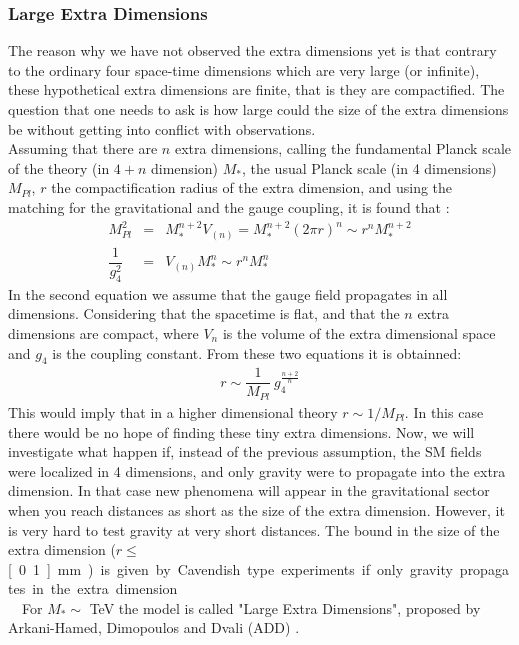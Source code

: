	

\subsubsection{Large Extra Dimensions}

The reason why we have not observed the extra dimensions yet is that contrary to the ordinary four space-time dimensions which are very large (or infinite), these hypothetical extra dimensions are finite, that is they are compactified. The  question that one needs to ask is how large could the size of the extra dimensions be without getting into conflict with observations.\\
\indent 
Assuming that there are $n$ extra dimensions, calling the fundamental Planck scale of the theory (in $4+n$ dimension) $M_{*}$, the usual Planck scale (in 4 dimensions) $M_{Pl}$, $r$ the compactification radius of the extra dimension, and using the matching for the gravitational and the gauge coupling, it is found that \cite{csaki}:
\begin{eqnarray}
M_{Pl}^{2} &=& M_{*}^{n+2}V_{(n)}= M_{*}^{n+2}\left(2 \pi r \right)^{n} \sim r^{n}M_{*}^{n+2}\label{planck}\\ 
\dfrac{1}{g_{4}^{2}} &=& V_{(n)}M_{*}^{n} \sim r^{n}M_{*}^{n}
\end{eqnarray}
In the second equation we assume that the gauge field propagates in all dimensions. Considering that the spacetime is flat, and that the $n$ extra dimensions are compact, where $V_{n}$ is the volume of the extra dimensional space and $g_{4}$ is the coupling constant. From these two equations it is obtainned:
\begin{eqnarray}
r \sim \dfrac{1}{M_{Pl}}\:g_{4}^{\frac{n+2}{n}}
\end{eqnarray}
This would imply that in a higher dimensional theory $r \sim 1/M_{Pl}$. In this case there would be no hope of finding these tiny extra dimensions. Now, we will investigate what happen if, instead of the previous assumption, the SM fields were localized in 4 dimensions, and only gravity were to propagate into the extra dimension. 
In that case new phenomena will appear in the gravitational sector when you reach distances as short as the size of the extra dimension. However, it is very hard to test gravity at very short distances. The bound in the size of the extra dimension ($r\leq$ \unit[0.1]{mm}) is given by Cavendish type experiments if only gravity propagates in the extra dimension.\\ 
\indent
For $M_{*}\sim$ \unit[1]{TeV} the model is called "Large Extra Dimensions", proposed by Arkani-Hamed, Dimopoulos and Dvali (ADD) \cite{ArkaniHamed:1998a}.
